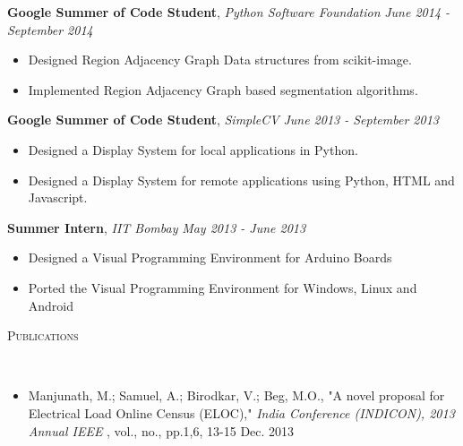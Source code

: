 \documentclass[9pt]{article}
\newenvironment{changemargin}[2]{%
  \begin{list}{}{%
    \setlength{\topsep}{0pt}%
    \setlength{\leftmargin}{#1}%
    \setlength{\rightmargin}{#2}%
    \setlength{\listparindent}{\parindent}%
    \setlength{\itemindent}{\parindent}%
    \setlength{\parsep}{\parskip}%
  }%
  \item[]}{\end{list}
}
\newcommand{\lineover}{
	\begin{changemargin}{-0.05in}{-0.05in}
		\vspace*{-8pt}
		\color{NavyBlue}
		\hrulefill \\
		\vspace*{-2pt}
	\end{changemargin}
}
\newcommand{\header}[1]{
	\begin{changemargin}{-0.5in}{-0.5in}
		\scshape{\textcolor{NavyBlue}{#1}}\\
  	\lineover
	\end{changemargin}
}
\newenvironment{body} {
	\vspace*{-16pt}
	\begin{changemargin}{-0.25in}{-0.5in}
  }	
	{\end{changemargin}
}
\begin{document}
\begin{body}
	\vspace{14pt}
	\textbf{Google Summer of Code Student}, \emph{Python Software Foundation} \hfill \emph{June 2014 - September 2014}\\
	\vspace*{-4pt}
	\begin{itemize} \itemsep -0pt  %
		\item Designed Region Adjacency Graph Data structures from scikit-image.
		\item Implemented Region Adjacency Graph based segmentation algorithms.
	\end{itemize}	
	
	
	\textbf{Google Summer of Code Student}, \emph{SimpleCV} \hfill \emph{June 2013 - September 2013}\\
	\vspace*{-4pt}
	\begin{itemize} \itemsep -0pt  %
		\item Designed a Display System for local applications in Python.
		\item Designed a Display System for remote applications using Python, HTML and Javascript.
	\end{itemize}

	\textbf {Summer Intern}, \emph{IIT Bombay} \hfill \emph{May 2013 - June 2013}\\
	\vspace*{-4pt}
	\begin{itemize} \itemsep -0pt
		\item Designed a Visual Programming Environment for Arduino Boards
		\item Ported the Visual Programming Environment for Windows, Linux and Android
	\end{itemize}
\end{body}

\smallskip




\header{Publications}

\begin{body}
	\vspace{14pt}
	\begin{itemize} \itemsep -0pt
		\item Manjunath, M.; Samuel, A.; Birodkar, V.; Beg, M.O., "A novel proposal for Electrical Load Online Census (ELOC)," \emph{India Conference (INDICON), 2013 Annual IEEE }, vol., no., pp.1,6, 13-15 Dec. 2013
	\end{itemize}
\end{body}
\smallskip
\end{document}
